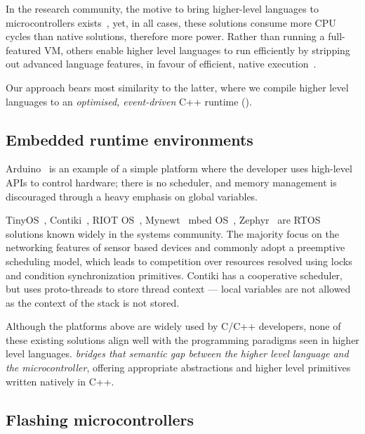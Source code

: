 In the research community, the motive to bring higher-level languages to microcontrollers exists~\cite{koshy2005vmstar,st2009picobit,vaugon2015programming}, yet, in all cases, these solutions consume more CPU cycles than native solutions, therefore more power. Rather than running a full-featured VM, others enable higher level languages to run efficiently by stripping out advanced language features, in favour of efficient, native execution~\cite{varma2004java}.

Our approach bears most similarity to the latter, where we compile higher level languages to an \emph{optimised, event-driven} C++ runtime (\CON).

\subsection{Embedded runtime environments}


Arduino~\cite{buildingArduino2014} is an example of a simple platform where the developer uses high-level APIs to control hardware; there is no scheduler, and memory management is discouraged through a heavy emphasis on global variables.

TinyOS~\cite{levis2005tinyos}, Contiki~\cite{dunkels2012contiki}, RIOT OS~\cite{baccelli2013riot}, Mynewt~\cite{ApacheMy53:online} mbed OS~\cite{ARMmbed}, Zephyr~\cite{HomeZeph63:online} are RTOS solutions known widely in the systems community. The majority focus on the networking features of sensor based devices and commonly adopt a preemptive scheduling model, which leads to competition over resources resolved using locks and condition synchronization primitives. Contiki has a cooperative scheduler, but uses proto-threads to store thread context --- local variables are not allowed as the context of the stack is not stored.

Although the platforms above are widely used by C/C++ developers, none of these existing solutions align well with the programming paradigms seen in higher level languages. \CO \emph{bridges that semantic gap between the higher level language and the microcontroller}, offering appropriate abstractions and higher level primitives written natively in C++.

\subsection{Flashing microcontrollers}

